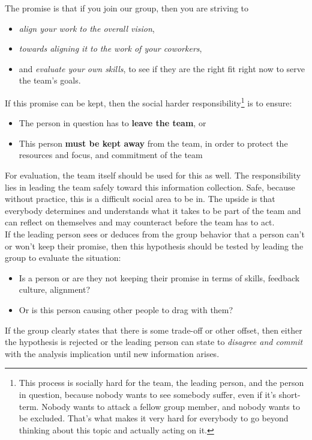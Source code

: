 The promise is that if you join our group, then you are striving to
\begin{itemize}
	\item \textit{align your work to the overall vision},
	\item \textit{towards aligning it to the work of your coworkers},
	\item  and \textit{evaluate your own skills}, to see if they are the right fit right now to serve the team's goals.
\end{itemize}


If this promise can be kept, then the social harder responsibility\footnote{
	This process is socially hard for the team, the leading person, and the person in question, because
	nobody wants to see somebody suffer, even if it's short-term. Nobody wants to attack a fellow group member, and nobody wants to be excluded. That's what makes it very hard for everybody to go beyond thinking about this topic and actually acting on it.
} is to ensure:
\begin{itemize}
	\item The person in question has to \textbf{leave the team}, or
	\item This person \textbf{must be kept away} from the team, in order to protect the resources and focus, and commitment of the team
\end{itemize}

For evaluation, the team itself should be used for this as well. The responsibility lies in leading the team safely toward this information collection. Safe, because without practice, this is a difficult social area to be in. The upside is that everybody determines and understands what it takes to be part of the team and can reflect on themselves and may counteract before the team has to act.\\

If the leading person sees or deduces from the group behavior that a person can't or won't keep their promise, then this hypothesis should be tested by leading the group to evaluate the situation:
\begin{itemize}
	\item Is a person or are they not keeping their promise in terms of skills, feedback culture, alignment?
	\item Or is this person causing other people to drag with them?
\end{itemize}
If the group clearly states that there is some trade-off or other offset, then either the hypothesis is rejected or the leading person can state to \textit{disagree and commit} with the analysis implication until new information arises.\\

